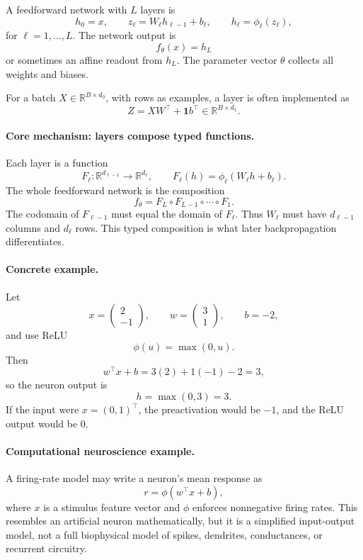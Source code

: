 A feedforward network with \(L\) layers is
\[
h_0=x,
\qquad
z_\ell=W_\ell h_{\ell-1}+b_\ell,
\qquad
h_\ell=\phi_\ell(z_\ell),
\]
for \(\ell=1,\ldots,L\). The network output is
\[
f_\theta(x)=h_L
\]
or sometimes an affine readout from \(h_L\). The parameter vector \(\theta\) collects all weights and biases.

For a batch \(X\in\mathbb R^{B\times d_0}\), with rows as examples, a layer is often implemented as
\[
Z=XW^\top+\mathbf 1 b^\top\in\mathbb R^{B\times d_1}.
\]

\paragraph{Core mechanism: layers compose typed functions.}
Each layer is a function
\[
F_\ell:\mathbb R^{d_{\ell-1}}\to\mathbb R^{d_\ell},
\qquad
F_\ell(h)=\phi_\ell(W_\ell h+b_\ell).
\]
The whole feedforward network is the composition
\[
\boxed{
f_\theta=F_L\circ F_{L-1}\circ\cdots\circ F_1.
}
\]
The codomain of \(F_{\ell-1}\) must equal the domain of \(F_\ell\). Thus \(W_\ell\) must have \(d_{\ell-1}\) columns and \(d_\ell\) rows. This typed composition is what later backpropagation differentiates.

\paragraph{Concrete example.}
Let
\[
x=\begin{pmatrix}2\\-1\end{pmatrix},\qquad
w=\begin{pmatrix}3\\1\end{pmatrix},\qquad
b=-2,
\]
and use ReLU
\[
\phi(u)=\max(0,u).
\]
Then
\[
w^\top x+b=3(2)+1(-1)-2=3,
\]
so the neuron output is
\[
h=\max(0,3)=3.
\]
If the input were \(x=(0,1)^\top\), the preactivation would be \(-1\), and the ReLU output would be \(0\).

\paragraph{Computational neuroscience example.}
A firing-rate model may write a neuron's mean response as
\[
r=\phi(w^\top x+b),
\]
where \(x\) is a stimulus feature vector and \(\phi\) enforces nonnegative firing rates. This resembles an artificial neuron mathematically, but it is a simplified input-output model, not a full biophysical model of spikes, dendrites, conductances, or recurrent circuitry.

